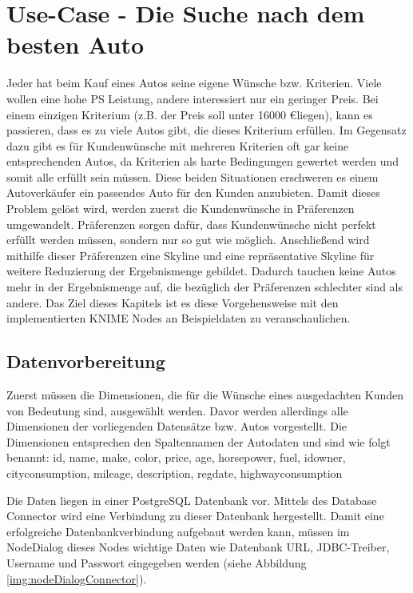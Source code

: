 \chapter{Use-Case - Die Suche nach dem besten Auto}
\label{ch:useCase}
Jeder hat beim Kauf eines Autos seine eigene Wünsche bzw. Kriterien. Viele wollen eine hohe PS Leistung, andere interessiert nur ein geringer Preis. Bei einem einzigen Kriterium (z.B. der Preis soll unter 16000 \euro liegen), kann es passieren, dass es zu viele Autos gibt, die dieses Kriterium erfüllen.
Im Gegensatz dazu gibt es für Kundenwünsche mit mehreren Kriterien oft gar keine entsprechenden Autos, da Kriterien als harte Bedingungen gewertet werden und somit alle erfüllt sein müssen. Diese beiden Situationen erschweren es einem Autoverkäufer ein passendes Auto für den Kunden anzubieten. Damit dieses Problem gelöst wird, werden zuerst die Kundenwünsche in Präferenzen umgewandelt. Präferenzen sorgen dafür, dass Kundenwünsche nicht perfekt erfüllt werden müssen, sondern nur so gut wie möglich. Anschließend wird mithilfe dieser Präferenzen eine Skyline und eine repräsentative Skyline für weitere Reduzierung der Ergebnismenge gebildet. Dadurch tauchen keine Autos mehr in der Ergebnismenge auf, die bezüglich der Präferenzen schlechter sind als andere.
Das Ziel dieses Kapitels ist es diese Vorgehensweise mit den implementierten KNIME Nodes an Beispieldaten zu veranschaulichen.
\section{Datenvorbereitung}
\label{ch:Evaluierung:sec:vorbereitung}
Zuerst müssen die Dimensionen, die für die Wünsche eines ausgedachten Kunden von Bedeutung sind, ausgewählt werden. Davor werden allerdings alle Dimensionen der vorliegenden Datensätze bzw. Autos vorgestellt. Die Dimensionen entsprechen den Spaltennamen der Autodaten und sind wie folgt benannt: id, name, make, color, price, age, horsepower, fuel, idowner, city\textunderscore consumption, mileage, description, reg\textunderscore date, highway\textunderscore consumption

Die Daten liegen in einer PostgreSQL Datenbank vor. Mittels des Database Connector wird eine Verbindung zu dieser Datenbank hergestellt. Damit eine erfolgreiche Datenbankverbindung aufgebaut werden kann, müssen im NodeDialog dieses Nodes wichtige Daten wie Datenbank URL, JDBC-Treiber, Username und Passwort eingegeben werden (siehe Abbildung \ref{img:nodeDialogConnector}). 

